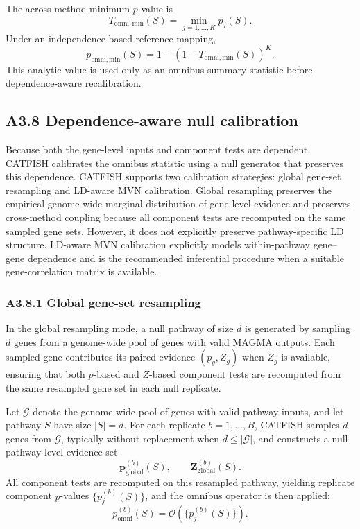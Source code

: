 \documentclass[unnumsec,webpdf,contemporary,large]{oup-authoring-template}%
\theoremstyle{thmstyleone}%
\theoremstyle{thmstyletwo}%
\theoremstyle{thmstylethree}%
\begin{document}
\begin{appendices}
The across-method minimum $p$-value is
\[
T_{\mathrm{omni,min}}(S)
=
\min_{j=1,\dots,K}p_j(S).
\]
Under an independence-based reference mapping,
\[
p_{\mathrm{omni,min}}(S)
=
1-\left(1-T_{\mathrm{omni,min}}(S)\right)^K.
\]
This analytic value is used only as an omnibus summary statistic before dependence-aware recalibration.

\subsection{A3.8 Dependence-aware null calibration}

Because both the gene-level inputs and component tests are dependent, CATFISH calibrates the omnibus statistic using a null generator that preserves this dependence. CATFISH supports two calibration strategies: global gene-set resampling and LD-aware MVN calibration. Global resampling preserves the empirical genome-wide marginal distribution of gene-level evidence and preserves cross-method coupling because all component tests are recomputed on the same sampled gene sets. However, it does not explicitly preserve pathway-specific LD structure. LD-aware MVN calibration explicitly models within-pathway gene--gene dependence and is the recommended inferential procedure when a suitable gene-correlation matrix is available.

\subsubsection{A3.8.1 Global gene-set resampling}

In the global resampling mode, a null pathway of size $d$ is generated by sampling $d$ genes from a genome-wide pool of genes with valid MAGMA outputs. Each sampled gene contributes its paired evidence $(p_g,Z_g)$ when $Z_g$ is available, ensuring that both $p$-based and $Z$-based component tests are recomputed from the same resampled gene set in each null replicate.

Let $\mathcal{G}$ denote the genome-wide pool of genes with valid pathway inputs, and let pathway $S$ have size $|S|=d$. For each replicate $b=1,\dots,B$, CATFISH samples $d$ genes from $\mathcal{G}$, typically without replacement when $d\le|\mathcal{G}|$, and constructs a null pathway-level evidence set
\[
\mathbf{p}^{(b)}_{\mathrm{global}}(S),
\qquad
\mathbf{Z}^{(b)}_{\mathrm{global}}(S).
\]
All component tests are recomputed on this resampled pathway, yielding replicate component $p$-values $\{p_j^{(b)}(S)\}$, and the omnibus operator is then applied:
\[
p_{\mathrm{omni}}^{(b)}(S)
=
\mathcal{O}\!\left(\{p_j^{(b)}(S)\}\right).
\]


\end{appendices}
\end{document}
